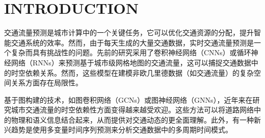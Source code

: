 \documentclass[10.5pt,compsoc,UTF8]{CjC}
\theoremstyle{mystyle}
\begin{document}
\vskip 10mm




\section{INTRODUCTION}


交通流量预测是城市计算中的一个关键任务，它可以优化交通资源的分配，提升智能交通系统的效率。然而，由于每天生成的大量交通数据，实时交通流量预测是一个复杂而具有挑战性的问题。先前的研究采用了卷积神经网络（CNNs）或循环神经网络（RNNs）来预测基于城市级网格地图的交通流量，这可以捕捉交通数据中的时空依赖关系。然而，这些模型在建模非欧几里德数据（如交通流量）的复杂空间关系方面存在局限性。

基于图构建的技术，如图卷积网络（GCNs）或图神经网络（GNNs），近年来在研究城市交通流量的时空依赖性方面变得越来越受欢迎。这些方法可以将道路网络中的物理和语义信息结合起来，从而提供对交通动态的更全面理解。此外，有一种新兴趋势是使用多变量时间序列预测来分析交通数据中的多周期时间模式。
\end{document}
